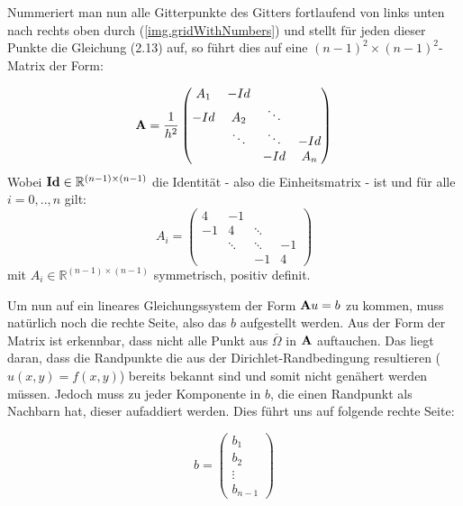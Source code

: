 \label{img.gridWithNumbers}

Nummeriert man nun alle Gitterpunkte des Gitters fortlaufend von links unten nach rechts oben durch (\autoref{img.gridWithNumbers}) und stellt für jeden dieser Punkte die Gleichung (2.13) auf, so führt dies auf eine $(n-1)^{2} \times (n-1)^{2}$-Matrix der Form:

\begin{equation}
{\textbf{A}} = \frac {1} {h^{2}}
\begin{pmatrix}
A_{1} & -Id \\
-Id & A_{2} & \ddots \\
 & \ddots & \ddots & -Id \\
 & & -Id & A_{n}
\end{pmatrix}
\end{equation}
Wobei ${\textbf{Id}} \in \mathbb{R}^{(n-1) \times (n-1)}$ die Identität - also die Einheitsmatrix - ist und für alle $i = 0,..,n$ gilt:
\begin{equation}
A_{i} = 
\begin{pmatrix}
4 & -1 & & \\
-1 & 4 & \ddots & \\
 & \ddots & \ddots & -1 \\
 & & -1 & 4
\end{pmatrix}
\end{equation}
mit $A_{i} \in \mathbb{R}^{(n-1) \times (n-1)}$ symmetrisch, positiv definit.

Um nun auf ein lineares Gleichungssystem der Form ${\textbf{A}}u = b$ zu kommen, muss natürlich noch die rechte Seite, also das $b$ aufgestellt werden. Aus der Form der Matrix ist erkennbar, dass nicht alle Punkt aus $\overline \Omega$ in ${\textbf{A}}$ auftauchen. Das liegt daran, dass die Randpunkte die aus der Dirichlet-Randbedingung resultieren ($u(x,y) = f(x,y)$) bereits bekannt sind und somit nicht genähert werden müssen. Jedoch muss zu jeder Komponente in $b$, die einen Randpunkt als Nachbarn hat, dieser aufaddiert werden. Dies führt uns auf folgende rechte Seite:

\begin{equation}
b = 
\begin{pmatrix}
b_{1} \\ b_{2} \\ \vdots \\ b_{n-1}
\end{pmatrix}
\end{equation}

